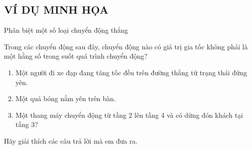 \subsection{VÍ DỤ MINH HỌA}
\begin{dang}{Phân biệt một số loại chuyển động thẳng }
\end{dang}
\begin{vd}
	Trong các chuyển động sau đây, chuyển động nào có giá trị gia tốc không phải là một hằng số trong suốt quá trình chuyển động?
	\begin{enumerate}[label=\alph*)]
		\item Một người đi xe đạp đang tăng tốc đều trên đường thẳng từ trạng thái đứng yên.
		\item Một quả bóng nằm yên trên bàn.
		\item Một thang máy chuyển động từ tầng 2 lên tầng 4 và có dừng đón khách tại tầng 3?
	\end{enumerate}
	Hãy giải thích các câu trả lời mà em đưa ra.
\end{vd}

